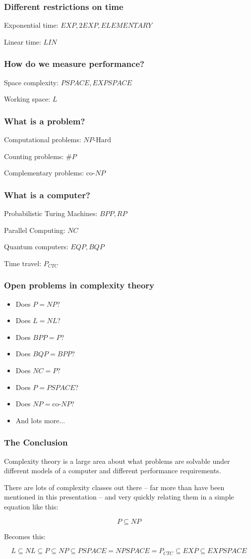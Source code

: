 \documentclass[aspectratio=169]{beamer}
\begin{document}
\begin{frame}
\frametitle{Different restrictions on time}
Exponential time: $EXP, 2EXP, ELEMENTARY$

Linear time: $LIN$
\end{frame}

\begin{frame}
\frametitle{How do we measure performance?}
Space complexity: $PSPACE, EXPSPACE$

Working space: $L$
\end{frame}

\begin{frame}
\frametitle{What is a problem?}
Computational problems: $NP\text{-Hard}$

Counting problems: $\#P$

Complementary problems: $\text{co-}NP$
\end{frame}

\begin{frame}
\frametitle{What is a computer?}
Probabilistic Turing Machines: $BPP, RP$

Parallel Computing: $NC$

Quantum computers:  $EQP, BQP$

Time travel: $P_{CTC}$
\end{frame}

\begin{frame}
\frametitle{Open problems in complexity theory}
\begin{itemize}
    \item<1-> Does $P = NP$?
    \item<2-> Does $L = NL$?
    \item<3-> Does $BPP = P$?
    \item<4-> Does $BQP = BPP$?
    \item<5-> Does $NC = P$?
    \item<6-> Does $P = PSPACE$?
    \item<7-> Does $NP = \text{co-}NP$?
    \item<8-> And lots more...
\end{itemize}
\end{frame}

\begin{frame}
\frametitle{The Conclusion}
Complexity theory is a large area about what problems are solvable under different models of a computer and different performance requirements.

There are lots of complexity classes out there -- far more than have been mentioned in this presentation -- and very quickly relating them in a simple equation like this:

$$P \subseteq NP$$

Becomes this:

$$L \subseteq NL \subseteq P \subseteq NP \subseteq PSPACE = NPSPACE = P_{CTC} \subseteq EXP \subseteq EXPSPACE$$
\end{frame}
\end{document}
